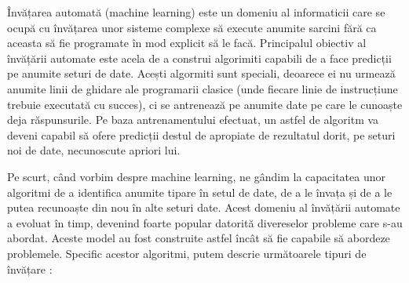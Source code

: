 \documentclass[a4paper,12pt]{report}
\begin{document}
 	 Învățarea automată (machine learning) este un domeniu al informaticii care se ocupă cu învățarea unor sisteme complexe să execute anumite sarcini fără ca aceasta să fie programate în mod explicit să le facă. Principalul obiectiv al învățării automate este acela de a construi algorimiti capabili de a face predicții pe anumite seturi de date. Acești algormiti sunt speciali, deoarece ei nu urmează anumite linii de ghidare ale programarii clasice (unde fiecare linie de instrucțiune trebuie executată cu succes), ci se antrenează pe anumite date pe care le cunoaște deja răspunsurile. Pe baza antrenamentului efectuat, un astfel de algoritm va deveni capabil să ofere predicții destul de apropiate de rezultatul dorit, pe seturi noi de date, necunoscute apriori lui. 
    
   	 Pe scurt, când vorbim despre machine learning, ne gândim la capacitatea unor algoritmi de a identifica anumite tipare în setul de date, de a le învața și de a le putea recunoaște din nou în alte seturi date. Acest domeniu al învățării automate a evoluat în timp, devenind foarte popular datorită divereselor probleme care s-au abordat. Aceste model au fost construite astfel încât să fie capabile să abordeze problemele. Specific acestor algoritmi, putem descrie următoarele tipuri de învățare \cite{supervised_unsupervised} :
   	 
\end{document}
